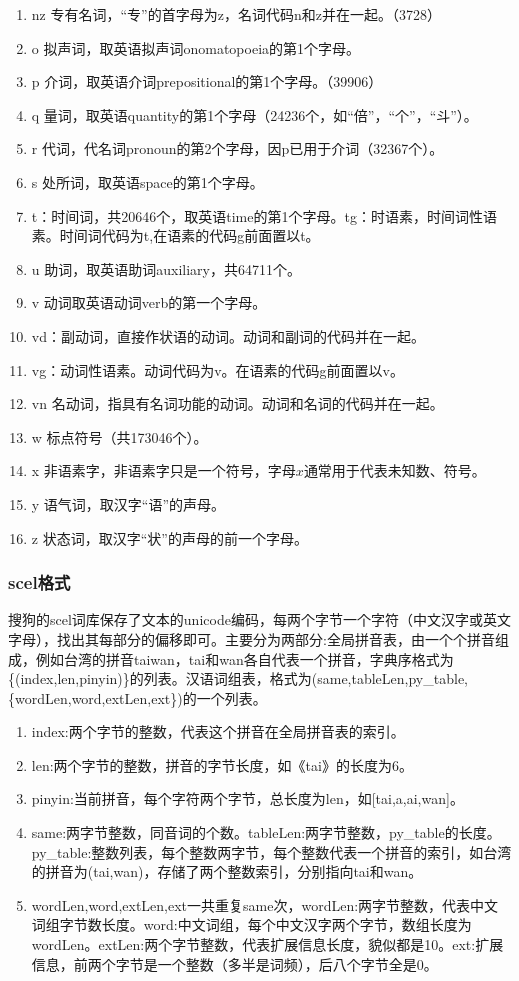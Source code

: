 \begin{enumerate}[(1)]
\item nz 专有名词，“专”的首字母为z，名词代码n和z并在一起。（3728）
\item o 拟声词，取英语拟声词onomatopoeia的第1个字母。
\item p 介词，取英语介词prepositional的第1个字母。（39906）
\item q 量词，取英语quantity的第1个字母（24236个，如“倍”，“个”，“斗”）。
\item r 代词，代名词pronoun的第2个字母，因p已用于介词（32367个）。
\item s 处所词，取英语space的第1个字母。
\item t：时间词，共20646个，取英语time的第1个字母。tg：时语素，时间词性语素。时间词代码为t,在语素的代码g前面置以t。
\item u 助词，取英语助词auxiliary，共64711个。
\item v 动词取英语动词verb的第一个字母。
\item vd：副动词，直接作状语的动词。动词和副词的代码并在一起。
\item vg：动词性语素。动词代码为v。在语素的代码g前面置以v。
\item vn 名动词，指具有名词功能的动词。动词和名词的代码并在一起。
\item w 标点符号（共173046个）。
\item x 非语素字，非语素字只是一个符号，字母$x$通常用于代表未知数、符号。
\item y 语气词，取汉字“语”的声母。
\item z 状态词，取汉字“状”的声母的前一个字母。
\end{enumerate}
\subsubsection{scel格式}
\par 搜狗的scel词库保存了文本的unicode编码，每两个字节一个字符（中文汉字或英文字母），找出其每部分的偏移即可。主要分为两部分:全局拼音表，由一个个拼音组成，例如台湾的拼音taiwan，tai和wan各自代表一个拼音，字典序格式为\{(index,len,pinyin)\}的列表。汉语词组表，格式为(same,tableLen,py\_table,\{wordLen,word,extLen,ext\})的一个列表。
\begin{enumerate}[(1)]
\item index:两个字节的整数，代表这个拼音在全局拼音表的索引。
\item len:两个字节的整数，拼音的字节长度，如《tai》的长度为6。
\item pinyin:当前拼音，每个字符两个字节，总长度为len，如[tai,a,ai,wan]。
\item same:两字节整数，同音词的个数。tableLen:两字节整数，py\_table的长度。py\_table:整数列表，每个整数两字节，每个整数代表一个拼音的索引，如台湾的拼音为(tai,wan)，存储了两个整数索引，分别指向tai和wan。
\item {wordLen,word,extLen,ext}一共重复same次，wordLen:两字节整数，代表中文词组字节数长度。word:中文词组，每个中文汉字两个字节，数组长度为wordLen。extLen:两个字节整数，代表扩展信息长度，貌似都是10。ext:扩展信息，前两个字节是一个整数（多半是词频），后八个字节全是0。
\end{enumerate}
